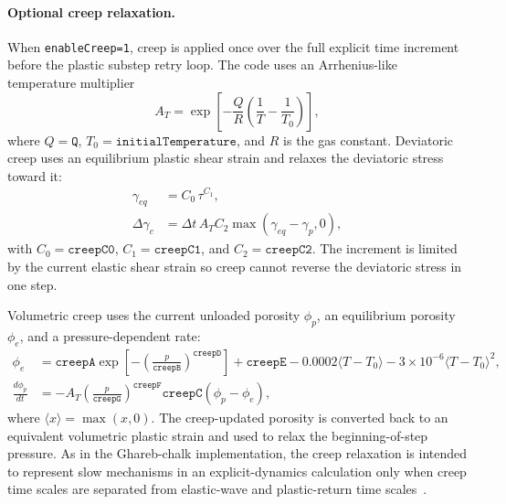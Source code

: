 \paragraph{Optional creep relaxation.}
When \texttt{enableCreep=1}, creep is applied once over the full explicit time increment before the plastic substep retry loop.  The code uses an Arrhenius-like temperature multiplier
\begin{equation}
  A_T = \exp\left[-\frac{Q}{R}\left(\frac{1}{T}-\frac{1}{T_0}\right)\right],
  \label{eq:geomechanics-temperature-creep}
\end{equation}
where \(Q=\texttt{Q}\), \(T_0=\texttt{initialTemperature}\), and \(R\) is the gas constant.  Deviatoric creep uses an equilibrium plastic shear strain and relaxes the deviatoric stress toward it:
\begin{align}
  \gamma_{eq} &= C_0\,\tau^{C_1},\\
  \Delta\gamma_c &= \Delta t\,A_T C_2\max(\gamma_{eq}-\gamma_p,0),
  \label{eq:geomechanics-dev-creep}
\end{align}
with \(C_0=\texttt{creepC0}\), \(C_1=\texttt{creepC1}\), and \(C_2=\texttt{creepC2}\).  The increment is limited by the current elastic shear strain so creep cannot reverse the deviatoric stress in one step.

Volumetric creep uses the current unloaded porosity \(\phi_p\), an equilibrium porosity \(\phi_e\), and a pressure-dependent rate:
\begin{align}
  \phi_e &= \texttt{creepA}\exp\left[-\left(\frac{p}{\texttt{creepB}}\right)^{\texttt{creepD}}\right]
           + \texttt{creepE} - 0.0002\langle T-T_0\rangle - 3\times 10^{-6}\langle T-T_0\rangle^2,\\
  \frac{d\phi_p}{dt} &= -A_T\left(\frac{p}{\texttt{creepG}}\right)^{\texttt{creepF}}
  \texttt{creepC}\left(\phi_p-\phi_e\right),
  \label{eq:geomechanics-vol-creep}
\end{align}
where \(\langle x\rangle=\max(x,0)\).  The creep-updated porosity is converted back to an equivalent volumetric plastic strain and used to relax the beginning-of-step pressure.  As in the Ghareb-chalk implementation, the creep relaxation is intended to represent slow mechanisms in an explicit-dynamics calculation only when creep time scales are separated from elastic-wave and plastic-return time scales~\cite{malenda2025ghareb}.

